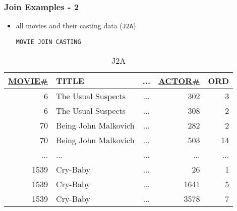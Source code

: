 \documentclass[dvipsnames]{beamer}
\theoremstyle{plain}
\begin{document}
\begin{frame}[fragile]
  \frametitle{Join Examples - 2}

  \begin{itemize}
    \item all movies and their casting data (\texttt{J2A})
    \begin{lstlisting}
MOVIE JOIN CASTING
    \end{lstlisting}
  \end{itemize}

  \vspace{-10pt}
  \begin{tiny}
  \begin{table}
    \caption{J2A}
    \begin{tabular}{|r|l|c|r|r|}\hline
\underline{MOVIE\#} & TITLE & ... & \underline{ACTOR\#} & ORD\\[2pt]\hline\hline
   6 & The Usual Suspects   & ... &                 302 &   3\\\hline
   6 & The Usual Suspects   & ... &                 308 &   2\\\hline
  70 & Being John Malkovich & ... &                 282 &   2\\\hline
  70 & Being John Malkovich & ... &                 503 &  14\\\hline
 ... & ...                  & ... &                 ... & ...\\\hline
1539 & Cry-Baby             & ... &                  26 &   1\\\hline
1539 & Cry-Baby             & ... &                1641 &   5\\\hline
1539 & Cry-Baby             & ... &                3578 &   7\\\hline
    \end{tabular}
  \end{table}
  \end{tiny}
\end{frame}
\end{document}
